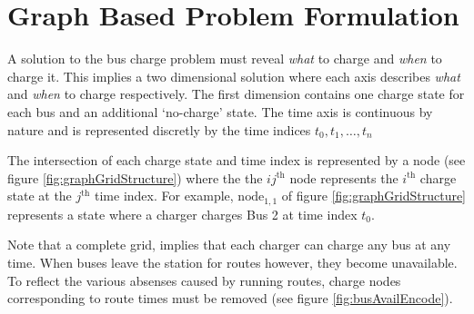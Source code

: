 \section{Graph Based Problem Formulation}
A solution to the bus charge problem must reveal \textit{what} to charge and \textit{when} to charge it. This implies a two dimensional solution where each axis describes \textit{what} and \textit{when} to charge respectively. The first dimension contains one charge state for each bus and an additional `no-charge' state. The time axis is continuous by nature and is represented discretly by the time indices $t_0,t_1,\hdots,t_n$ 
\par The intersection of each charge state and time index is represented by a node (see figure \ref{fig:graphGridStructure}) where the the $ij^{\text{th}}$ node represents the $i^{\text{th}}$ charge state at the $j^{\text{th}}$ time index. For example, $\text{node}_{1,1}$ of figure \ref{fig:graphGridStructure} represents a state where a charger charges Bus 2 at time index $t_0$. 
\par Note that a complete grid, implies that each charger can charge any bus at any time.  When buses leave the station for routes however, they become unavailable. To reflect the various absenses caused by running routes, charge nodes corresponding to route times must be removed (see figure \ref{fig:busAvailEncode}). 

